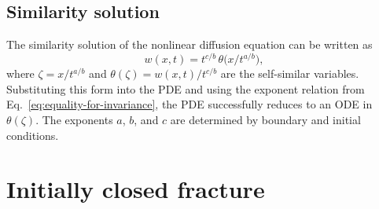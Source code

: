\documentclass[12pt]{article}
\begin{document}
\subsection{Similarity solution}

The similarity solution of the nonlinear diffusion equation can be written as
\begin{equation*}
	w(x, t) = t^{c / b} \, \theta\big(x / t^{a / b}\big),
\end{equation*}
where $\zeta = x / t^{a / b}$ and $\theta(\zeta) = w(x,t)/ t^{c / b}$ are the self-similar variables. Substituting this form into the PDE and using the exponent relation from Eq.~\ref{eq:equality-for-invariance}, the PDE successfully reduces to an ODE in $\theta(\zeta)$. The exponents $a$, $b$, and $c$ are determined by boundary and initial conditions.

\section{Initially closed fracture}
\end{document}

